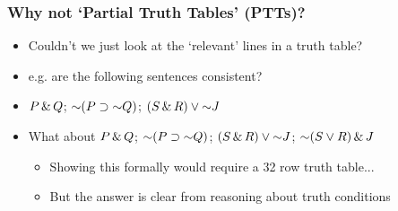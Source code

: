 \begin{frame}
\frametitle{Why not `Partial Truth Tables' (PTTs)?}

\begin{itemize}[<+->]

\item Couldn't we just look at the `relevant' lines in a truth table?

\item e.g. are the following sentences consistent? 

\item $P \,\&\, Q$; $\enot (P \eif \enot Q)$; $(S \eand R) \eor \enot J$

\item What about $P \,\&\, Q$; $\enot (P \eif \enot Q)$; $(S \eand R) \eor \enot J$; $\enot (S \eor R) \eand J$

\medskip 

\begin{itemize}

\item Showing this formally would require a 32 row truth table...

\item But the answer is clear from reasoning about truth conditions  

\end{itemize}


\end{itemize}
\end{frame}

